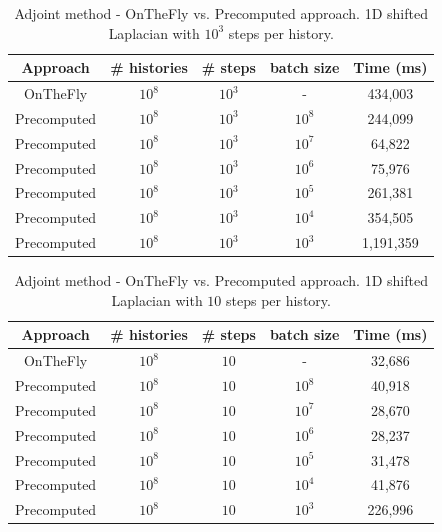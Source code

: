 \documentclass[a4paper,10pt]{article}
\begin{document}
\begin{table}[!h]
\hspace*{1.5cm}
\begin{tabular}{|c|c|c|c|c|}
\hline
\textbf{Approach} & \textbf{\# histories} &\textbf{\# steps} & \textbf{batch 
size} 
& \textbf{Time (ms)} \\
\hline
OnTheFly& $10^8$ & $10^3$ & - & 434,003 \\
\hline 
Precomputed& $10^8$ & $10^3$ & $10^8$ & 244,099\\
\hline
Precomputed& $10^8$ & $10^3$ & $10^7$ & 64,822\\
\hline
Precomputed& $10^8$ & $10^3$ & $10^6$ & 75,976\\
\hline
Precomputed& $10^8$ & $10^3$ & $10^5$ & 261,381\\
\hline
Precomputed& $10^8$ & $10^3$ & $10^4$ & 354,505\\
\hline
Precomputed& $10^8$ & $10^3$ & $10^3$ & 1,191,359\\
\hline
\end{tabular}
\caption{Adjoint method - OnTheFly vs. Precomputed approach. 1D shifted 
Laplacian with $10^3$ steps per history.} 
\label{tab44}
\end{table}


\begin{table}[!h]
\hspace*{1.5cm}
\begin{tabular}{|c|c|c|c|c|}
\hline
\textbf{Approach} & \textbf{\# histories} &\textbf{\# steps} & \textbf{batch 
size} 
& \textbf{Time (ms)} \\
\hline
OnTheFly& $10^8$ & $10$ & - & 32,686 \\
\hline 
Precomputed& $10^8$ & $10$ & $10^8$ & 40,918\\
\hline
Precomputed& $10^8$ & $10$ & $10^7$ & 28,670\\
\hline
Precomputed& $10^8$ & $10$ & $10^6$ & 28,237\\
\hline
Precomputed& $10^8$ & $10$ & $10^5$ & 31,478\\
\hline
Precomputed& $10^8$ & $10$ & $10^4$ & 41,876\\
\hline
Precomputed& $10^8$ & $10$ & $10^3$ & 226,996\\
\hline
\end{tabular}
\caption{Adjoint method - OnTheFly vs. Precomputed approach. 1D shifted 
Laplacian with $10$ steps per history.} 
\label{tab45}
\end{table}
\end{document}
